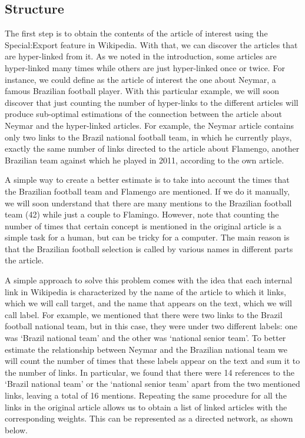 \documentclass[11pt]{article}
\begin{document}
\subsection{Structure}

The first step is to obtain the contents of the article of interest using the Special:Export feature in Wikipedia. With that, we can discover the articles that are hyper-linked from it. As we noted in the introduction, some articles are hyper-linked many times while others are just hyper-linked once or twice. For instance, we could define as the article of interest the one about Neymar, a famous Brazilian football player. With this particular example, we will soon discover that just counting the number of hyper-links to the different articles will produce sub-optimal estimations of the connection between the article about Neymar and the hyper-linked articles. For example, the Neymar article contains only two links to the Brazil national football team, in which he currently plays, exactly the same number of links directed to the article about Flamengo, another Brazilian team against which he played in 2011, according to the own article.

A simple way to create a better estimate is to take into account the times that the Brazilian football team and Flamengo are mentioned. If we do it manually, we will soon understand that there are many mentions to the Brazilian football team (42) while just a couple to Flamingo. However, note that counting the number of times that certain concept is mentioned in the original article is a simple task for a human, but can be tricky for a computer. The main reason is that the Brazilian football selection is called by various names in different parts the article. 

A simple approach to solve this problem comes with the idea that each internal link in Wikipedia is characterized by the name of the article to which it links, which we will call target, and the name that appears on the text, which we will call label. For example, we mentioned that there were two links to the Brazil football national team, but in this case, they were under two different labels: one was ‘Brazil national team’ and the other was ‘national senior team’. To better estimate the relationship between Neymar and the Brazilian national team we will count the number of times that these labels appear on the text and sum it to the number of links. In particular, we found that there were 14 references to the ‘Brazil national team’ or the ‘national senior team’ apart from the two mentioned links, leaving a total of 16 mentions. Repeating the same procedure for all the links in the original article allows us to obtain a list of linked articles with the corresponding weights. This can be represented as a directed network, as shown below.
\end{document}
